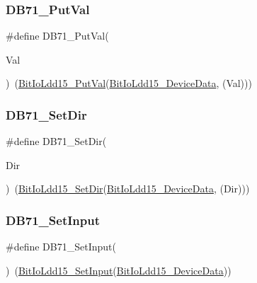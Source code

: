\subsubsection{\texorpdfstring{D\+B71\+\_\+\+Put\+Val}{DB71\_PutVal}}
{\footnotesize\ttfamily \#define D\+B71\+\_\+\+Put\+Val(\begin{DoxyParamCaption}\item[{}]{Val }\end{DoxyParamCaption})~(\hyperlink{group___bit_io_ldd15__module_ga875a36906d376856264c546b784ae909}{Bit\+Io\+Ldd15\+\_\+\+Put\+Val}(\hyperlink{group___bit_io_ldd15__module_ga7e053a3640af5a7522d2864dea4be75f}{Bit\+Io\+Ldd15\+\_\+\+Device\+Data}, (Val)))}

\mbox{\label{group___d_b71__module_gafedf042e1fa1b23fd4c49e6a995b2c58}} 
\subsubsection{\texorpdfstring{D\+B71\+\_\+\+Set\+Dir}{DB71\_SetDir}}
{\footnotesize\ttfamily \#define D\+B71\+\_\+\+Set\+Dir(\begin{DoxyParamCaption}\item[{}]{Dir }\end{DoxyParamCaption})~(\hyperlink{group___bit_io_ldd15__module_gaa625d107e194a1e065b8a51f20545860}{Bit\+Io\+Ldd15\+\_\+\+Set\+Dir}(\hyperlink{group___bit_io_ldd15__module_ga7e053a3640af5a7522d2864dea4be75f}{Bit\+Io\+Ldd15\+\_\+\+Device\+Data}, (Dir)))}

\mbox{\label{group___d_b71__module_gafbcbfd1c236ddf7cf5a7d9d9e5a440e5}} 
\subsubsection{\texorpdfstring{D\+B71\+\_\+\+Set\+Input}{DB71\_SetInput}}
{\footnotesize\ttfamily \#define D\+B71\+\_\+\+Set\+Input(\begin{DoxyParamCaption}{ }\end{DoxyParamCaption})~(\hyperlink{group___bit_io_ldd15__module_gada439e248c981dbaf15efd269de4d4d2}{Bit\+Io\+Ldd15\+\_\+\+Set\+Input}(\hyperlink{group___bit_io_ldd15__module_ga7e053a3640af5a7522d2864dea4be75f}{Bit\+Io\+Ldd15\+\_\+\+Device\+Data}))}

